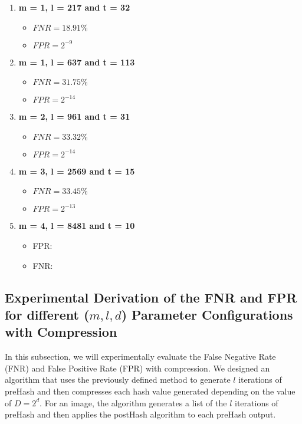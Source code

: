 \begin{enumerate}
    \item \textbf{m = 1, l = 217 and t = 32}
        \begin{itemize}
            \item $FNR = 18.91\%$
            \item $FPR = 2^{-9}$
        \end{itemize}
    \item \textbf{m = 1, l = 637 and t = 113}
        \begin{itemize}
            \item $FNR = 31.75\%$
            \item $FPR = 2^{-14}$ 
        \end{itemize}
    \item \textbf{m = 2, l = 961 and t = 31}
        \begin{itemize}
            \item  $FNR = 33.32\%$
            \item $FPR = 2^{-14}$
        \end{itemize}
    \item \textbf{m = 3, l = 2569 and t = 15}
        \begin{itemize}
            \item $FNR = 33.45\%$
            \item $FPR = 2^{-13}$ 
        \end{itemize}
    \item \textbf{m = 4, l = 8481 and t = 10}
        \begin{itemize}
            \item FPR: 
            \item FNR: 
        \end{itemize}
\end{enumerate}


\subsection{Experimental Derivation of the FNR and FPR for different (\(m, l, d\)) Parameter Configurations with Compression}

In this subsection, we will experimentally evaluate the False Negative Rate (FNR) and False Positive Rate (FPR) with compression. We designed an algorithm that uses the previously defined method to generate \( l \) iterations of preHash and then compresses each hash value generated depending on the value of \(D = 2^d\). For an image, the algorithm generates a list of the \( l \) iterations of preHash and then applies the postHash algorithm to each preHash output.

